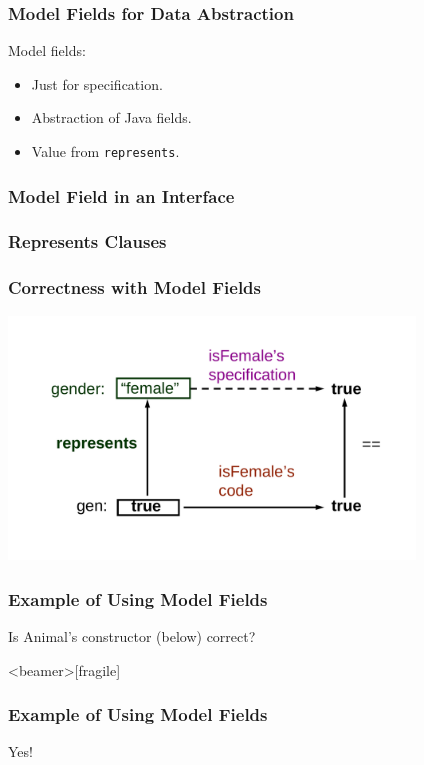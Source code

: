 \begin{frame}[fragile]
\frametitle{Model Fields for Data Abstraction}

Model fields:
\begin{itemize}
\item
Just for specification.

\item
Abstraction of Java fields.

\item
Value from \lstinline!represents!.
\end{itemize}
\end{frame}

\begin{frame}[fragile]
\frametitle{Model Field in an Interface}

\end{frame}

\begin{frame}[fragile]
\frametitle{Represents Clauses}

\end{frame}

\begin{frame}
\frametitle{Correctness with Model Fields}
\includegraphics[width=4.25in]{model-correctness}
\end{frame}

\begin{frame}[fragile]
\frametitle{Example of Using Model Fields}
\begin{question}
Is Animal's constructor (below) correct?
\rm

\end{question}
\end{frame}

\begin{frame}<beamer>[fragile]
\frametitle{Example of Using Model Fields}

\alert{Yes!}



\end{frame}

